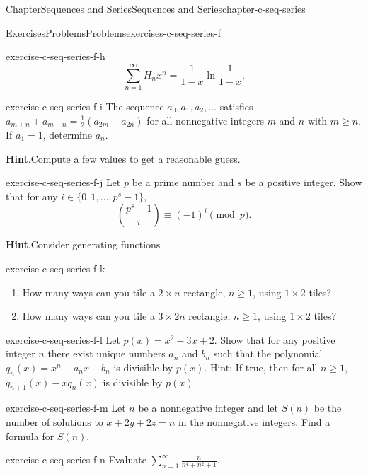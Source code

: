 \documentclass[oneside,10pt,]{book}
\newcommand{\blocktitlefont}{\relax}
\numberwithin{equation}{section}
\begin{document}
\begin{chapterptx}{Chapter}{Sequences and Series}{}{Sequences and Series}{}{}{chapter-c-seq-series}
\begin{exercises-section}{Exercises}{Problems}{}{Problems}{}{}{exercises-c-seq-series-f}
\begin{divisionexercise}{7}{}{}{exercise-c-seq-series-f-h}
\begin{equation*}
\sum_{n=1}^{\infty} H_{n} x^n = \frac{1}{1-x} \ln{\frac{1}{1-x}}\text{.}
\end{equation*}
%
\end{divisionexercise}%
\begin{divisionexercise}{8}{}{}{exercise-c-seq-series-f-i}%
The sequence \(a_0, a_1, a_2,\ldots\) satisfies \(a_{m+n}+a_{m-n}=\frac{1}{2}\left(a_{2m}+a_{2n}\right)\) for all nonnegative integers \(m\) and \(n\) with \(m\geq n\).  If \(a_1= 1\), determine \(a_n\).%
\par\smallskip%
\noindent\textbf{\blocktitlefont Hint}.\hypertarget{hint-c-seq-series-f-i-b}{}\quad{}Compute a few values to get a reasonable guess.%
\end{divisionexercise}%
\begin{divisionexercise}{9}{}{}{exercise-c-seq-series-f-j}%
Let \(p\) be a prime number and \(s\) be a positive integer.  Show that for any \(i \in \{0, 1, \dots,p^s-1\}\),%
\begin{equation*}
\binom{p^s-1}{i} \equiv (-1)^i \pmod{p}.
\end{equation*}
%
\par\smallskip%
\noindent\textbf{\blocktitlefont Hint}.\hypertarget{hint-c-seq-series-f-j-b}{}\quad{}Consider generating functions%
\end{divisionexercise}%
\begin{divisionexercise}{10}{}{}{exercise-c-seq-series-f-k}%
%
\begin{enumerate}[label=(\alph*)]
\item{}How many ways can you tile a \(2 \times  n\) rectangle, \(n\geq 1\), using \(1\times 2\) tiles?%
\item{}How many ways can you tile a \(3 \times  2n\) rectangle, \(n\geq 1\), using \(1\times 2\) tiles?%
\end{enumerate}
%
\end{divisionexercise}%
\begin{divisionexercise}{11}{}{}{exercise-c-seq-series-f-l}%
Let \(p(x)=x^2-3x + 2\).  Show that for any positive integer \(n\) there exist unique numbers \(a_n\) and \(b_n\) such that the polynomial \(q_n(x)=
x^n-a_nx-b_n\) is divisible by \(p(x)\).    Hint:  If true, then for all \(n\geq 1\),   \(q_{n+1}(x)-x q_n(x)\) is divisible by \(p(x)\).%
\end{divisionexercise}%
\begin{divisionexercise}{12}{}{}{exercise-c-seq-series-f-m}%
Let \(n\) be a nonnegative integer and let \(S(n)\) be the number of solutions to \(x + 2 y + 2 z = n\) in the nonnegative integers.  Find a formula for \(S(n)\).%
\end{divisionexercise}%
\begin{divisionexercise}{13}{}{}{exercise-c-seq-series-f-n}%
Evaluate \(\sum_{n=1}^{\infty} \frac{n}{n^4+n^2+1}\).%
\end{divisionexercise}%
\end{exercises-section}
\end{chapterptx}
\end{document}
